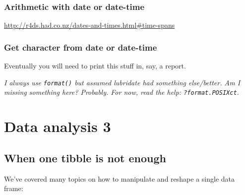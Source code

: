 \documentclass[
]{book}
\begin{document}
\hypertarget{arithmetic-with-date-or-date-time}{%
\section{Arithmetic with date or date-time}\label{arithmetic-with-date-or-date-time}}

\url{http://r4ds.had.co.nz/dates-and-times.html\#time-spans}

\hypertarget{get-character-from-date-or-date-time}{%
\section{Get character from date or date-time}\label{get-character-from-date-or-date-time}}

Eventually you will need to print this stuff in, say, a report.

\emph{I always use \texttt{format()} but assumed lubridate had something else/better. Am I missing something here? Probably. For now, read the help: \texttt{?format.POSIXct}.}

\hypertarget{part-data-analysis-3}{%
\part{Data analysis 3}\label{part-data-analysis-3}}

\hypertarget{multiple-tibbles}{%
\chapter{When one tibble is not enough}\label{multiple-tibbles}}

We've covered many topics on how to manipulate and reshape a single data frame:
\end{document}
